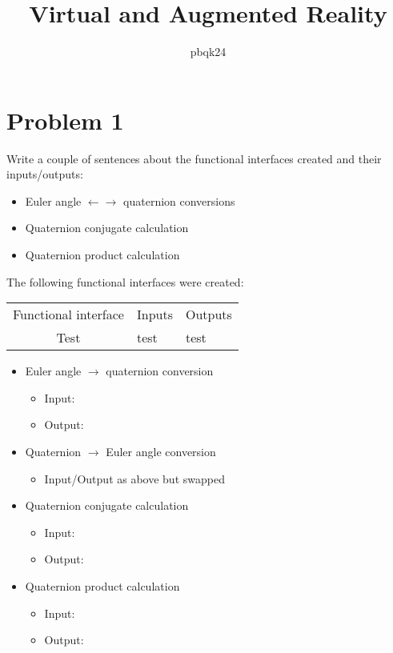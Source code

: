 \documentclass[12pt,a4paper]{article}
\title{\vspace{-6em}Virtual and Augmented Reality}
\author{pbqk24}
\begin{document}
	
	\maketitle
	
	\section*{Problem 1}
	
	Write a couple of sentences about the functional interfaces created and their inputs/outputs:
	\begin{itemize}
		\item Euler angle $\leftarrow\rightarrow$ quaternion conversions
		\item Quaternion conjugate calculation
		\item Quaternion product calculation
	\end{itemize}
	
	The following functional interfaces were created:
	
	\begin{tabular}{|c|ll|}
		
		\hline
		Functional interface&Inputs&Outputs\\
		Test&test&test\\
		\hline
	\end{tabular}
	
	
	\begin{itemize}
		\setlength{\itemsep}{0em}
		\item Euler angle $\rightarrow$ quaternion conversion
		\begin{itemize}
			\setlength{\itemsep}{0em}
			\item Input:
			\item Output:
		\end{itemize}
		\item Quaternion $\rightarrow$ Euler angle conversion
		\begin{itemize}
			\item Input/Output as above but swapped
		\end{itemize}
		\item Quaternion conjugate calculation
		\begin{itemize}
			\item Input: 
			\item Output:
		\end{itemize}
		\item Quaternion product calculation
		\begin{itemize}
			\item Input:
			\item Output: 
		\end{itemize}
	\end{itemize}
	
\end{document}
